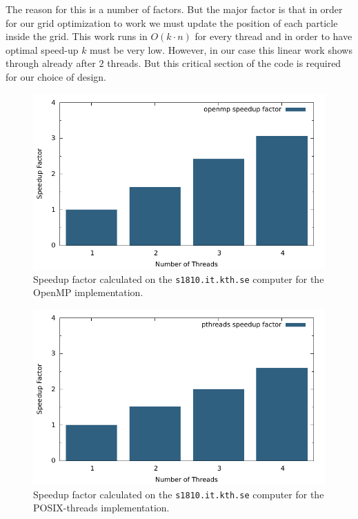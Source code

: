 The reason for this is a number of factors. But the major factor is that in order for our grid optimization to work we must update the position of each particle inside the grid. This work runs in $O(k \cdot n)$ for every thread and in order to have optimal speed-up $k$ must be very low. However, in our case this linear work shows through already after $2$ threads. But this critical section of the code is required for our choice of design.

\begin{figure}[H]
	\includegraphics{plots/openmp_speedup.pdf}
	\caption{Speedup factor calculated on the \texttt{s1810.it.kth.se} computer for the OpenMP implementation.}
\end{figure}
\begin{figure}[H]
	\includegraphics{plots/pthreads_speedup.pdf}
	\caption{Speedup factor calculated on the \texttt{s1810.it.kth.se} computer for the POSIX-threads implementation.}
\end{figure}

